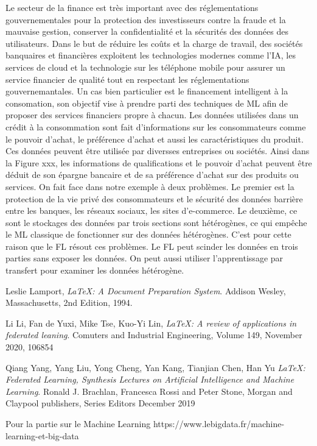 \documentclass[12pt,a4paper]{report}
\begin{document}
Le secteur de la finance est très important avec des réglementations gouvernementales pour la protection des investisseurs contre la fraude et la mauvaise gestion, conserver la confidentialité et la sécurités des données des utilisateurs. Dans le but de réduire les coûts et la charge de travail, des sociétés banquaires et financières exploitent les technologies modernes comme l'IA, les services de cloud et la technologie sur les téléphone mobile pour assurer un service financier de qualité tout en respectant les réglementations gouvernemantales. Un cas bien particulier est le financement intelligent à la consomation, son objectif vise à prendre parti des techniques de ML afin de proposer des services financiers propre à chacun. Les données utilisées dans un crédit à la consommation sont fait d'informations sur les consommateurs comme le pouvoir d'achat, le préférence d'achat et aussi les caractéristiques du produit. Ces données peuvent être utilisée par diversses entreprises ou sociétés. Ainsi dans la Figure xxx, les informations de qualifications et le pouvoir d'achat peuvent être déduit de son épargne bancaire et de sa préférence d'achat sur des produits ou services. On fait face dans notre exemple à deux problèmes. Le premier est la protection de la vie privé des consommateurs et le sécurité des données barrière entre les banques, les réseaux sociaux, les sites d'e-commerce. Le deuxième, ce sont le stockages des données par trois sections sont hétérogènes, ce qui empêche le ML classique de fonctionner sur des données hétérogènes. C'est pour cette raison que le FL résout ces problèmes. Le FL peut scinder les données en trois parties sans exposer les données. On peut aussi utiliser l'apprentissage par transfert pour examiner les données hétérogène.

\begin{thebibliography}{9}

	  Leslie Lamport,
	  \emph{\LaTeX: A Document Preparation System}.
	  Addison Wesley, Massachusetts,
	  2nd Edition,
	  1994.
	  
	  Li Li, Fan de Yuxi, Mike Tse, Kuo-Yi Lin,
	  \emph{\LaTeX: A review of applications in federated leaning}.
	  Comuters and Industrial Engineering,
	  Volume 149,
	  November 2020,
	  106854
	  
	  Qiang Yang, Yang Liu, Yong Cheng, Yan Kang, Tianjian Chen, Han Yu
	  \emph{\LaTeX: Federated Learning, Synthesis Lectures on Artificial Intelligence and Machine Learning}.
	  Ronald J. Brachlan, Francesca Rossi and Peter Stone,
	  Morgan and Claypool publishers,
	  Series Editors
	  December 2019
	  
	Pour la partie sur le Machine Learning https://www.lebigdata.fr/machine-learning-et-big-data

\end{thebibliography}
\end{document}
